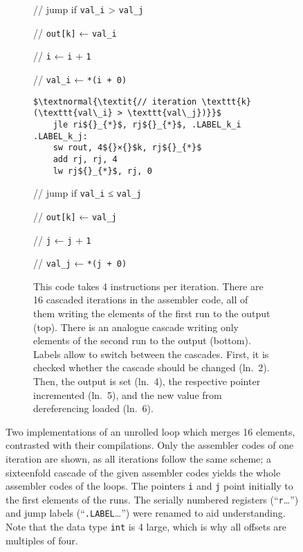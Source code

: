 \begin{figure}[p]
\begin{subfigure}{\textwidth}
\begin{minipage}{\assemblerwidth}
\begin{minipage}{ \widthof{\itshape// jump if \lstinline|val_i| > \lstinline|val_j|} }
				// jump if \lstinline|val_i| > \lstinline|val_j|

				\phantom{lg}

				// \lstinline|out[k]| ← \lstinline|val_i|

				// \lstinline|i| ← \lstinline|i| + \lstinline|1|

				// \lstinline|val_i| ← \lstinline|*(i + 0)|
			\end{minipage}
			\smallskip
			\begin{minipage}{ \widthof{\lstinline|	jgt ri*, rj*, .LABEL_k_j|~} }
				\begin{lstlisting}[language={[DPU]Assembler}, mathescape, keepspaces]
$\textnormal{\textit{// iteration \texttt{k} (\texttt{val\_i} > \texttt{val\_j})}}$
	jle ri${}_{*}$, rj${}_{*}$, .LABEL_k_i
.LABEL_k_j:
	sw rout, 4${}×{}$k, rj${}_{*}$
	add rj, rj, 4
	lw rj${}_{*}$, rj, 0
\end{lstlisting}
			\end{minipage}
			\hfill
			\begin{minipage}{ \widthof{\itshape// jump if \lstinline|val_i| > \lstinline|val_j|} }
				\itshape\small
				\phantom{lg}

				// jump if \lstinline|val_i| ≤ \lstinline|val_j|

				\phantom{lg}

				// \lstinline|out[k]| ← \lstinline|val_j|

				// \lstinline|j| ← \lstinline|j| + \lstinline|1|

				// \lstinline|val_j| ← \lstinline|*(j + 0)|
			\end{minipage}
		\end{minipage}
		\caption{
			This code takes 4 instructions per iteration.
			There are 16 cascaded iterations in the assembler code, all of them writing the elements of the first run to the output (top).
			There is an analogue cascade writing only elements of the second run to the output (bottom).
			Labels allow to switch between the cascades.
			First, it is checked whether the cascade should be changed (ln.~2).
			Then, the output is set (ln.~4), the respective pointer incremented (ln.~5), and the new value from dereferencing loaded (ln.~6).
		}
		\label{fig:merge:load:once}
	\end{subfigure}
	\caption{
		Two \langC{} implementations of an unrolled loop which merges 16 elements, contrasted with their compilations.
		Only the assembler codes of one iteration are shown, as all iterations follow the same scheme;
		a sixteenfold cascade of the given assembler codes yields the whole assembler codes of the loops.
		The pointers \lstinline|i| and \lstinline|j| point initially to the first elements of the runs.
		The serially numbered registers (\enquote{\lstinline|r|\dots}) and jump labels (\enquote{\lstinline|.LABEL|\dots}) were renamed to aid understanding.
		Note that the data type \lstinline[keywords={}]|int| is \qty{4}{\byte} large, which is why all offsets are multiples of four.
	}
	\label{fig:merge:load}
\end{figure}

